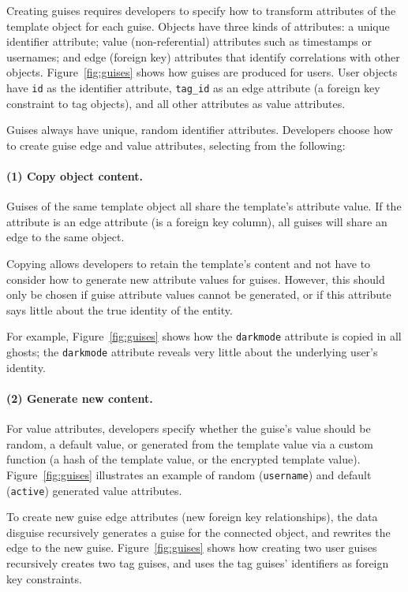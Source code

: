 Creating guises requires developers to specify how to transform attributes of the template
object for each guise.
%
Objects have three kinds of attributes: a unique identifier attribute; value
(non-referential) attributes such as timestamps or usernames; and edge (\eg foreign key)
attributes that identify correlations with other objects.
%
Figure~\ref{fig:guises} shows how guises are produced for users. User objects have \texttt{id} as
the identifier attribute,
\texttt{tag\_id} as an edge attribute (a foreign key constraint to tag objects),
and all other attributes as value attributes.

Guises always have unique, random identifier attributes.
Developers choose how to create guise edge and value attributes, selecting from the following:

\paragraph{(1) Copy object content.} Guises of the same template object all share the template's
    attribute value. If the attribute is an edge attribute (\eg is a foreign key column),
    all guises will share an edge to the same object.

    Copying allows developers to retain the template's content and not have to
    consider how to generate new attribute values for guises. However,
    this should only be chosen if guise attribute values cannot be generated, or if this
    attribute says little about the true identity of the entity.

    For example, Figure~\ref{fig:guises} shows how the \texttt{darkmode} attribute is copied in
    all ghosts; the \texttt{darkmode} attribute reveals very little about the underlying user's
    identity.

\paragraph{(2) Generate new content.}
        For value attributes, developers specify whether the guise's value should be random,
        a default value, or generated from the template value via a custom function (\eg a hash of
        the template value, or the encrypted template value). Figure~\ref{fig:guises} illustrates
        an example of random (\texttt{username}) and default (\texttt{active}) generated value attributes.

        To create new guise edge attributes (\eg new foreign key relationships), the data disguise
        recursively generates a guise for the connected object, and rewrites the edge to the new
        guise.  Figure~\ref{fig:guises} shows how creating two user guises recursively creates two
        tag guises, and uses the tag guises' identifiers as foreign key constraints.

